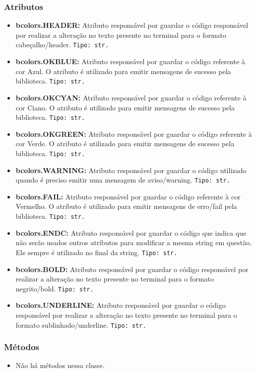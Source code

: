 \documentclass[10pt]{article}
\begin{document}
\begin{itemize}
        \subsubsection{\large Atributos}
            \begin{itemize}
            \item \textbf{bcolors.HEADER:} Atributo responsável por guardar o código responsável por realizar a alteração no texto presente no terminal para o formato cabeçalho/header. \texttt{Tipo: str.} 
            \item \textbf{bcolors.OKBLUE:} Atributo responsável por guardar o código referente à cor Azul. O atributo é utilizado para emitir mensagens de sucesso pela biblioteca. \texttt{Tipo: str.}
            \item \textbf{bcolors.OKCYAN:} Atributo responsável por guardar o código referente à cor Ciano. O atributo é utilizado para emitir mensagens de sucesso pela biblioteca. \texttt{Tipo: str.}
            \item \textbf{bcolors.OKGREEN:} Atributo responsável por guardar o código referente à cor Verde. O atributo é utilizado para emitir mensagens de sucesso pela biblioteca. \texttt{Tipo: str.}
            \item \textbf{bcolors.WARNING:} Atributo responsável por guardar o código utilizado quando é preciso emitir uma mensagem de aviso/warning. \texttt{Tipo: str.}
            \item \textbf{bcolors.FAIL:} Atributo responsável por guardar o código referente à cor Vermelho. O atributo é utilizado para emitir mensagens de erro/fail pela biblioteca. \texttt{Tipo: str.}
            \item \textbf{bcolors.ENDC:} Atributo responsável por guardar o código que indica que não serão usados outros atributos para modificar a mesma string em questão. Ele sempre é utilizado no final da string. \texttt{Tipo: str.}
            \item \textbf{bcolors.BOLD:} Atributo responsável por guardar o código responsável por realizar a alteração no texto presente no terminal para o formato negrito/bold. \texttt{Tipo: str.} 
            \item \textbf{bcolors.UNDERLINE:} Atributo responsável por guardar o código responsável por realizar a alteração no texto presente no terminal para o formato sublinhado/underline. \texttt{Tipo: str.} 
            \end{itemize}
        \subsubsection{\large Métodos}
            \begin{itemize}
            \item Não há métodos nessa classe.
            \end{itemize}
        

\end{itemize}
\end{document}
